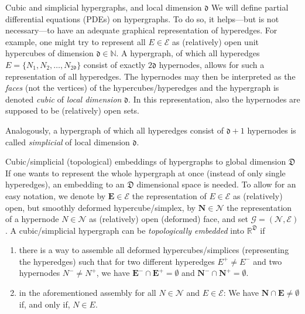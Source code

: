 \documentclass[a4paper, english, 12pt, reqno, draft]{amsart}
\makeatletter
\theoremstyle{definition}
\theoremstyle{remark}
\numberwithin{equation}{section}
\newcommand{\setEdge}{\ensuremath{\mathcal E}}
\newcommand{\setNode}{\ensuremath{\mathcal N}}
\newcommand{\edge}{\ensuremath{E}}
\newcommand{\node}{\ensuremath{N}}
\newcommand{\Graph}{\ensuremath{\boldsymbol{\mathcal G}}}
\newcommand{\SetEdge}{\ensuremath{\boldsymbol{\mathcal E}}}
\newcommand{\SetNode}{\ensuremath{\boldsymbol{\mathcal N}}}
\newcommand{\Edge}{{\ensuremath{\boldsymbol E}}}
\newcommand{\Node}{{\ensuremath{\boldsymbol N}}}
\newcommand{\locDim}{\ensuremath{\mathfrak d}}
\newcommand{\globDim}{\ensuremath{\mathfrak D}}
\newcommand{\IN}{\ensuremath{\mathbb N}}
\newcommand{\IR}{\ensuremath{\mathbb R}}
\def\paragraph{\@startsection{paragraph}{4}%
  \z@\z@{-\fontdimen2\font}%
  {\normalfont\scshape}}
\makeatother
\begin{document}
\paragraph{Cubic and simplicial hypergraphs, and local dimension $\locDim$}
% 
We will define partial differential equations (PDEs) on hypergraphs. To do so, it helps---but is not necessary---to have an adequate graphical representation of hyperedges. For example, one might try to represent all $\edge \in \setEdge$ as (relatively) open unit hypercubes of dimension $\locDim \in \IN$. A hypergraph, of which all hyperedges $\edge = \{ \node_1, \node_2, \ldots, \node_{2\locDim} \}$ consist of exactly $2\locDim$ hypernodes, allows for such a representation of all hyperedges. The hypernodes may then be interpreted as the \emph{faces} (not the vertices) of the hypercubes/hyperedges and the hypergraph is denoted \emph{cubic} of \emph{local dimension} $\locDim$. In this representation, also the hypernodes are supposed to be (relatively) open sets.

Analogously, a hypergraph of which all hyperedges consist of $\locDim+1$ hypernodes is called \emph{simplicial} of local dimension $\locDim$.

\paragraph{Cubic/simplicial (topological) embeddings of hypergraphs to global dimension $\globDim$}
% 
If one wants to represent the whole hypergraph at once (instead of only single hyperedges), an embedding to an $\globDim$ dimensional space is needed. To allow for an easy notation, we denote by $\Edge \in \SetEdge$ the representation of $\edge \in \setEdge$ as (relatively) open, but smoothly deformed hypercube/simplex, by $\Node \in \SetNode$ the representation of a hypernode $\node \in \setNode$ as (relatively) open (deformed) face, and set $\Graph = (\SetNode, \SetEdge)$. A cubic/simplicial hypergraph can be \emph{topologically embedded} into $\IR^\globDim$ if
% 
\begin{enumerate}
 \item there is a way to assemble all deformed hypercubes/simplices (representing the hyperedges) such that for two different hyperedges $\edge^+ \neq \edge^-$ and two hypernodes $\node^- \neq \node^+$, we have $\Edge^- \cap \Edge^+ = \emptyset$ and $\Node^- \cap \Node^+ = \emptyset$.
 \item in the aforementioned assembly for all $\node \in \setNode$ and $\edge \in \setEdge$: We have $\Node \cap \Edge \neq \emptyset$ if, and only if, $\node \in \edge$.
\end{enumerate}
% 
\end{document}
